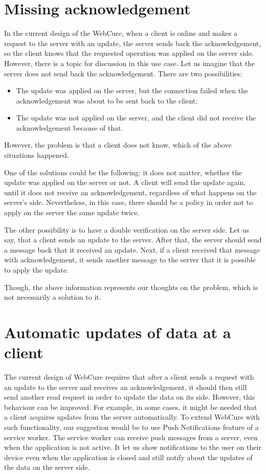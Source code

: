 \section*{Missing acknowledgement}

In the current design of the WebCure, when a client is online and makes a request to the server with an update, the server sends back the acknowledgement, so the client knows that the requested operation was applied on the server side. However, there is a topic for discussion in this use case. Let us imagine that the server does not send back the acknowledgement. There are two possibilities:

\begin{itemize}
    \item {The update was applied on the server, but the connection failed when the acknowledgement was about to be sent back to the client;}
    \item {The update was not applied on the server, and the client did not receive the acknowledgement because of that.}
\end{itemize}

However, the problem is that a client does not know, which of the above situations happened. 

One of the solutions could be the following: it does not matter, whether the update was applied on the server or not. A client will send the update again, until it does not receive an acknowledgement, regardless of what happens on the server's side. Nevertheless, in this case, there should be a policy in order not to apply on the server the same update twice.

The other possibility is to have a double verification on the server side. Let us say, that a client sends an update to the server. After that, the server should send a message back that it received an update. Next, if a client received that message with acknowledgement, it sends another message to the server that it is possible to apply the update. 

Though, the above information represents our thoughts on the problem, which is not necessarily a solution to it.  

\section*{Automatic updates of data at a client}

The current design of WebCure requires that after a client sends a request with an update to the server and receives an acknowledgement, it should then still send another read request in order to update the data on its side. However, this behaviour can be improved. For example, in some cases, it might be needed that a client acquires updates from the server automatically. To extend WebCure with such functionality, our suggestion would be to use Push Notifications feature\cite{32} of a service worker. The service worker can receive push messages from a server, even when the application is not active. It let us show notifications to the user on their device even when the application is closed and still notify about the updates of the data on the server side.

